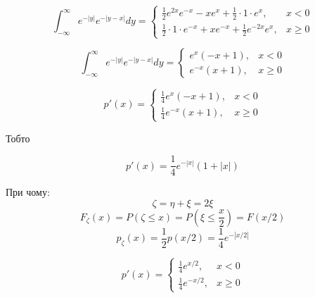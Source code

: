 \documentclass[11pt, a4paper]{article} %
\begin{document}
$$\int_{-\infty}^\infty e^{-|y|}e^{-|y-x|} dy = \begin{cases}
    \frac{1}{2}e^{2x}e^{-x} - xe^{x} 
    + \frac{1}{2} \cdot 1 \cdot e^{x} ,& x<0 \\
    \frac{1}{2} \cdot 1 \cdot e^{-x} + xe^{-x}
    + \frac{1}{2}e^{-2x}e^{x} ,& x\ge 0 
\end{cases}$$

$$\int_{-\infty}^\infty e^{-|y|}e^{-|y-x|} dy = \begin{cases}
    e^{x}(-x+1) ,& x<0 \\
    e^{-x} (x+1) ,& x\ge 0
\end{cases}$$

$$p'(x) = \begin{cases}
    \frac{1}{4} e^{x} (-x+1) ,& x<0 \\
    \frac{1}{4} e^{-x} (x+1) ,& x\ge 0
\end{cases}$$

Тобто

$$p'(x) = \frac{1}{4} e^{-|x|}(1+|x|)$$

\begin{mdframed}[backgroundcolor=violet!10]
    При чому:
    $$\zeta = \eta + \xi = 2\xi$$
    $$F_\zeta(x) = P(\zeta \le x) = P(\xi \le \frac{x}{2}) = F(x/2)$$
    $$p_\zeta(x) = \frac{1}{2} p(x/2) = \frac{1}{4} e^{-|x/2|}$$

    $$p'(x) = \begin{cases}
        \frac{1}{4} e^{x/2}, & x<0\\
        \frac{1}{4} e^{-x/2}, & x\ge 0
    \end{cases}$$
\end{mdframed}

\end{document}
